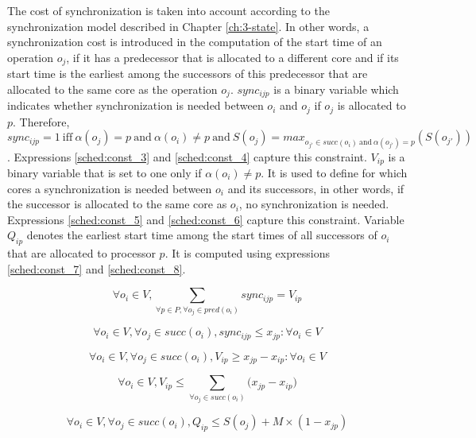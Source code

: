 The cost of synchronization is taken into account according to the synchronization model described in Chapter \ref{ch:3-state}. In other words, a synchronization cost is introduced in the computation of the start time of an operation $o_j$, if it has a predecessor that is allocated to a different core and if its start time is the earliest among the successors of this predecessor that are allocated to the same core as the operation $o_j$. $sync_{ijp}$ is a binary variable which indicates whether synchronization is needed between $o_i$ and $o_j$ if $o_j$ is allocated to $p$. Therefore, $sync_{ijp} = 1\ \text{iff}\ \alpha(o_j)=p\ \text{and}\ \alpha(o_i)\neq p\  \text{and}\ S(o_j) = max_{o_{j'} \in succ(o_i)\ \text{and}\ \alpha(o_{j'}) = p}(S(o_{j'}))$. Expressions \ref{sched:const_3} and \ref{sched:const_4} capture this constraint. $V_{ip}$ is a binary variable that is set to one only if $\alpha(o_i) \neq p$. It is used to define for which cores a synchronization is needed between $o_i$ and its successors, in other words, if the successor is allocated to the same core as $o_i$, no synchronization is needed. Expressions \ref{sched:const_5} and \ref{sched:const_6} capture this constraint. Variable $Q_{ip}$ denotes the earliest start time among the start times of all successors of $o_i$ that are allocated to processor $p$. It is computed using expressions \ref{sched:const_7} and \ref{sched:const_8}. 


\begin{equation}
\forall o_i \in V, \sum_{\forall p \in P, \forall o_j \in pred(o_i)}sync_{ijp}= V_{ip}
\label{sched:const_3}
\end{equation}

\begin{equation}
\forall o_i \in V, \forall o_j \in succ(o_i), sync_{ijp} \leq x_{jp}: \forall o_i \in V
\label{sched:const_4}
\end{equation}

\begin{equation}
\forall o_i \in V, \forall o_j \in succ(o_i), V_{ip} \geq x_{jp} - x_{ip}: \forall o_i \in V
\label{sched:const_5}
\end{equation}

\begin{equation}
 \forall o_i \in V, V_{ip} \leq \sum_{\forall o_j \in succ(o_i)}\big(x_{jp} - x_{ip}\big)
\label{sched:const_6}
\end{equation}

\begin{equation}
\forall o_i \in V, \forall o_j \in succ(o_i), Q_{ip} \leq S(o_j) + M \times (1-x_{jp})
\label{sched:const_7}
\end{equation}

